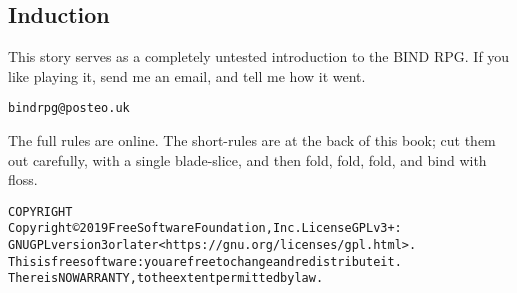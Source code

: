 
\subsection*{Induction}

This story serves as a completely untested introduction to the BIND RPG.
If you like playing it, send me an email, and tell me how it went.

\texttt{bindrpg@posteo.uk}

The full rules are online.
The short-rules are at the back of this book; cut them out carefully, with a single blade-slice, and then fold, fold, fold, and bind with floss.

\begin{alltt}
COPYRIGHT
       Copyright \copyright 2019 Free Software Foundation, Inc.  License GPLv3+:
  GNU GPL version 3 or later <https://gnu.org/licenses/gpl.html>.
       This is free software: you are free to change and redistribute it.
  There is NO WARRANTY, to the extent permitted by law.

\end{alltt}
